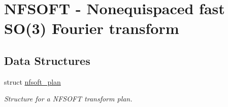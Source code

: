 \hypertarget{group__nfsoft}{
\section{NFSOFT - Nonequispaced fast SO(3) Fourier transform}
\label{group__nfsoft}
}
\subsection*{Data Structures}
\begin{CompactItemize}
\item 
struct \hyperlink{structnfsoft__plan}{nfsoft\_\-plan}
\begin{CompactList}\small\item\em Structure for a NFSOFT transform plan. \item\end{CompactList}\end{CompactItemize}
